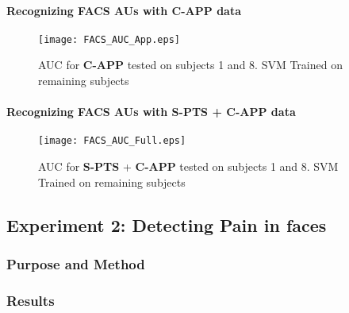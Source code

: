 \documentclass[Main]{subfiles}
\begin{document}

			\paragraph{Recognizing FACS AUs with \textbf{C-APP} data} %
				\label{par:recognizing_facs_aus_with_c_app_data}
				\begin{figure}[H]
					\begin{center}
						\texttt{[image: FACS\_AUC\_App.eps]}
					\end{center}
					\caption{
						AUC for \textbf{C-APP} tested on subjects 1 and 8.
						SVM Trained on remaining subjects
						}
					\label{fig:capp_auc}
				\end{figure}

			\paragraph{Recognizing FACS AUs with \textbf{S-PTS} + \textbf{C-APP} data} %
				\label{par:recognizing_facs_aus_with_s_pts_c_app_data}
				\begin{figure}[H]
					\begin{center}
						\texttt{[image: FACS\_AUC\_Full.eps]}
					\end{center}
					\caption{
						AUC for \textbf{S-PTS} + \textbf{C-APP} tested on subjects 1 and 8.
						SVM Trained on remaining subjects
						}
					\label{fig:full_auc}
				\end{figure}
				
			
		

	\subsection{Experiment 2: Detecting Pain in faces} %
		\label{sub:experiment_2_detecting_pain_in_faces}
		\subsubsection{Purpose and Method} %
			\label{ssub:purpose_and_method_ex2}
			


		\subsubsection{Results} %
			\label{ssub:results_ex2}
				
\end{document}
